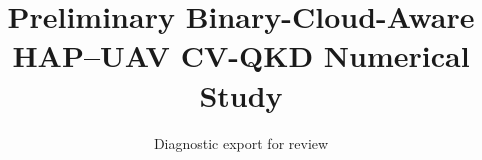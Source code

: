\documentclass[conference]{IEEEtran}
\begin{document}
\title{Preliminary Binary-Cloud-Aware HAP--UAV CV-QKD Numerical Study}
\author{Diagnostic export for review}
\maketitle


\end{document}
